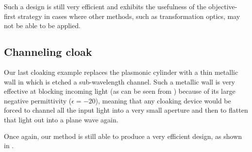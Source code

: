 Such a design is still very efficient
    and exhibits the usefulness of the objective-first strategy
    in cases where other methods, such as transformation optics,
    may not be able to be applied.

\subsection{Channeling cloak}
Our last cloaking example replaces the plasmonic cylinder 
    with a thin metallic wall in which is etched a sub-wavelength channel.
Such a metallic wall is very effective at blocking incoming light
    (as can be seen from ) 
    because of its large negative permittivity ($\epsilon = -20$),
    meaning that any cloaking device would be forced to channel
    all the input light into a very small aperture
    and then to flatten that light out into a plane wave again.

Once again, our method is still able to produce a very efficient design,
    as shown in .

